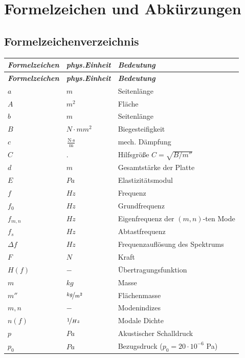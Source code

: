 \chapter*{Formelzeichen und Abk\"urzungen}

\section*{Formelzeichenverzeichnis}
\enlargethispage{-4cm}

\renewcommand{\arraystretch}{1.3}
\setlength{\tabcolsep}{12pt}
\begin{longtable}[l]{l l p{8.5cm}}
\bfseries \emph{Formelzeichen}& \bfseries \emph{phys.Einheit} &\bfseries \emph{Bedeutung}\\
\endfirsthead
\bfseries \emph{Formelzeichen}& \bfseries \emph{phys.Einheit} &\bfseries \emph{Bedeutung}\\
\endhead
$a$	& $m$	&Seitenlänge\\
$A$ & $m^2$ & Fläche\\
$b$ & $m$ & Seitenlänge\\
$B$ & $N \cdot mm^2$ & Biegesteifigkeit\\
$c$ & $\frac{\text{N} \cdot \text{s}}{\text{m}}$ & mech. Dämpfung\\
$C$ & $.$ & Hilfsgröße $C = \sqrt{B/m''}$\\
$d$ & $m$ & Gesamtstärke der Platte\\
$E$ & $Pa$ & Elastizitätsmodul\\
$f$ & $Hz$ & Frequenz\\
$f_0$ & $Hz$ & Grundfrequenz\\
$f_{m,n}$ & $Hz$ & Eigenfrequenz der $(m,n)$-ten Mode\\
$f_s$ & $Hz$ & Abtastfrequenz\\
$\Delta f$ & $Hz$ & Frequenzauflösung des Spektrums\\
$F$ & $N$&	Kraft\\
$H(f)$ & $-$ & Übertragungsfunktion\\

$m$	& $kg$&	Masse\\
$m''$ & $\nicefrac{kg}{m^2}$ & Flächenmasse\\
$m, n$ & $-$ & Modenindizes\\

$n(f)$ & $\nicefrac{1}{Hz}$ & Modale Dichte\\
$p$ & $Pa$ & Akustischer Schalldruck\\
$p_0$ & $Pa$ & Bezugsdruck ($p_0 = 20 \cdot 10^{-6}$ Pa)\\


\end{longtable}
